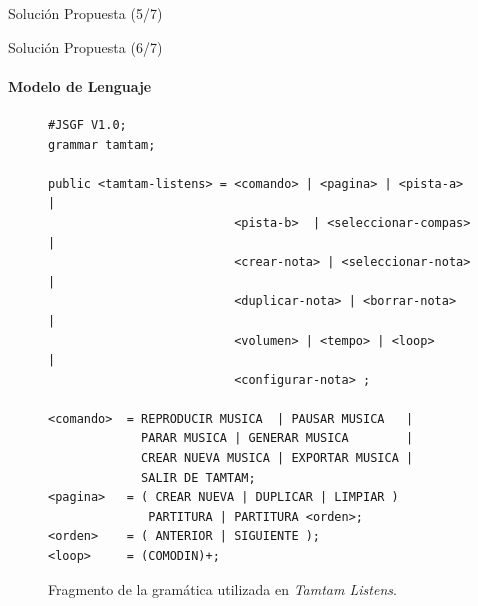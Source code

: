 \begin{frame}{Soluci\'on Propuesta (5/7)}

\end{frame}


\begin{frame}[fragile]{Soluci\'on Propuesta (6/7)}
\framesubtitle{Modelo de Lenguaje}
\begin{figure}[H]
\lstset{basicstyle=\ttfamily\scriptsize}
\begin{lstlisting}
#JSGF V1.0;
grammar tamtam;

public <tamtam-listens> = <comando> | <pagina> | <pista-a>  |
                          <pista-b>  | <seleccionar-compas> | 
                          <crear-nota> | <seleccionar-nota> | 
                          <duplicar-nota> | <borrar-nota>   | 
                          <volumen> | <tempo> | <loop>      |
                          <configurar-nota> ;

<comando>  = REPRODUCIR MUSICA  | PAUSAR MUSICA   |
             PARAR MUSICA | GENERAR MUSICA        | 
             CREAR NUEVA MUSICA | EXPORTAR MUSICA | 
             SALIR DE TAMTAM;
<pagina>   = ( CREAR NUEVA | DUPLICAR | LIMPIAR ) 
              PARTITURA | PARTITURA <orden>;
<orden>    = ( ANTERIOR | SIGUIENTE );
<loop>     = (COMODIN)+;
\end{lstlisting}
\caption{Fragmento de la gram\'atica utilizada en \emph{Tamtam Listens}.}
\label{figure:fragmento-gram}
\end{figure} 
\end{frame}

